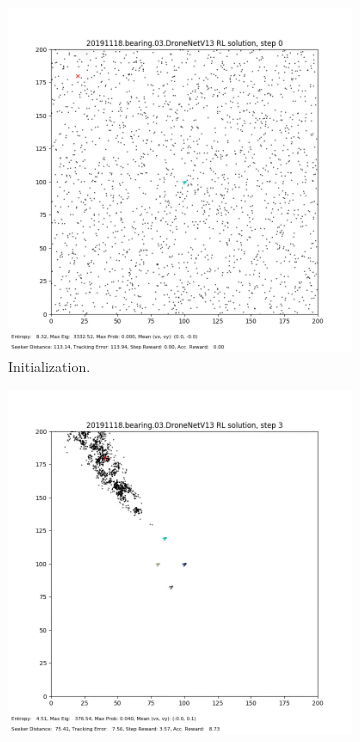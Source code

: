 \documentclass[10pt,twocolumn,letterpaper]{article}
\begin{document}
\begin{figure}[h!]
  \centering
  \begin{subfigure}[b]{0.48\linewidth}
    \includegraphics[width=\linewidth]{images/fifth.png}
    \caption{Initialization.}
  \end{subfigure}
  \begin{subfigure}[b]{0.48\linewidth}
    \includegraphics[width=\linewidth]{images/sixth.png}

\end{subfigure}
\end{figure}
\end{document}
